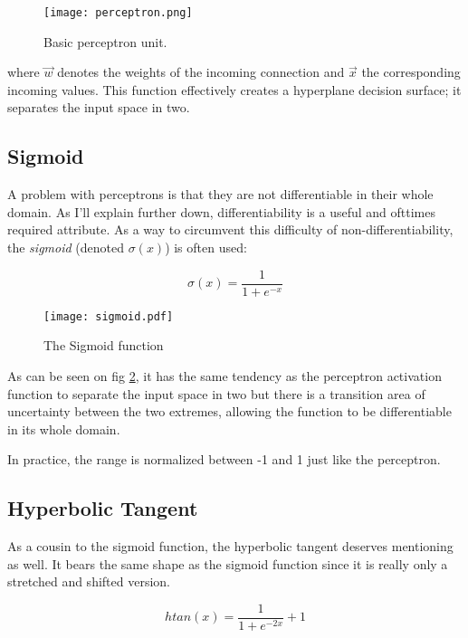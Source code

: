 \begin{figure}
\label{fig.ml.perceptron}
\center
\texttt{[image: perceptron.png]}
\caption{Basic perceptron unit.}
\end{figure}

where $\overrightarrow{w}$ denotes the weights of the incoming connection
and $\overrightarrow{x}$ the corresponding incoming values.
This function effectively creates a hyperplane decision surface;
it separates the input space in two.

\subsection{Sigmoid}
\label{sec:sigmoid}
A problem with perceptrons
is that they are not differentiable
in their whole domain.
As I'll explain further down, %
differentiability is a useful and ofttimes required attribute.
As a way to circumvent this difficulty of non-differentiability,
the \textit{sigmoid} (denoted $\sigma(x)$) is often used:

\begin{equation}
\label{eq.ml.sigmoid}
\sigma(x) = \frac{1}{1 + e^{-x}}
\end{equation}

\begin{figure}[h]
\center
\texttt{[image: sigmoid.pdf]}
\caption{The Sigmoid function}
\label{fig.ml.sigmoid}
\end{figure}

As can be seen on fig \ref{fig.ml.sigmoid},
it has the same tendency as the perceptron activation function
to separate the input space in two
but there is a transition area of uncertainty between the two extremes,
allowing the function to be differentiable in its whole domain.

In practice, the range is normalized between -1 and 1
just like the perceptron.

\subsection{Hyperbolic Tangent}
As a cousin to the sigmoid function, the hyperbolic tangent
deserves mentioning as well.
It bears the same shape as the sigmoid function
since it is really only a stretched
and shifted version.

\begin{equation}
\label{eq.ml.tanh}
htan(x) = \frac{1}{1 + e^{-2x}}+1
\end{equation}

